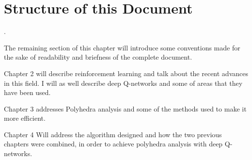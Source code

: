\section{Structure of this Document}.

The remaining section of this chapter will introduce some conventions made for the sake of readability and briefness of the complete document.

Chapter 2 will describe reinforcement learning and talk about the recent advances in this field. I will as well describe deep Q-networks and some of areas that they have been used.

Chapter 3 addresses Polyhedra analysis and some of the methods used to make it more efficient. 

Chapter 4 Will address the algorithm designed and how the two previous chapters were combined, in order to achieve polyhedra analysis with deep Q-networks.


%
%

